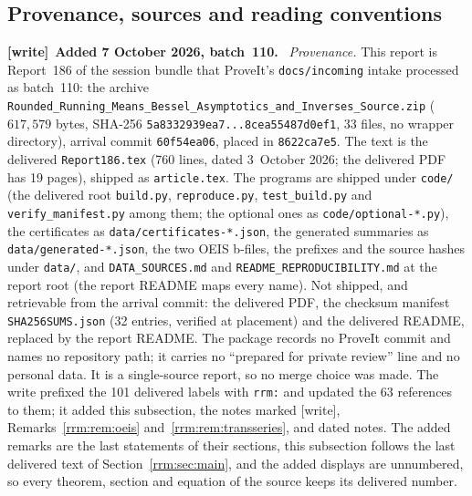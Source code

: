\documentclass[11pt]{article}
\theoremstyle{remark}\newtheorem{remark}[theorem]{Remark}
\newcommand{\file}[1]{\nolinkurl{#1}}
\newenvironment{writenote}[1][]{\par\smallskip\begingroup\small
 \noindent\textbf{[write]}\if\relax\detokenize{#1}\relax\else~\textbf{#1.}\fi\ }%
 {\par\endgroup\smallskip}
\begin{document}
\subsection{Provenance, sources and reading conventions}\label{rrm:sec:provenance}
\begin{writenote}[Added 7 October 2026, batch~110]
\emph{Provenance.} This report is Report~186 of the session bundle that
ProveIt's \file{docs/incoming} intake processed as batch~110: the archive
\file{Rounded_Running_Means_Bessel_Asymptotics_and_Inverses_Source.zip}
($617{,}579$ bytes, SHA-256 \file{5a8332939ea7...8cea55487d0ef1},
33 files, no wrapper directory), arrival commit \file{60f54ea06}, placed in
\file{8622ca7e5}. The text is the delivered \file{Report186.tex} (760 lines,
dated 3~October 2026; the delivered PDF has 19 pages), shipped as
\file{article.tex}. The programs are shipped under \file{code/} (the
delivered root \file{build.py}, \file{reproduce.py}, \file{test_build.py}
and \file{verify_manifest.py} among them; the optional ones as
\file{code/optional-*.py}), the certificates as
\file{data/certificates-*.json}, the generated summaries as
\file{data/generated-*.json}, the two OEIS b-files, the prefixes and the
source hashes under \file{data/}, and \file{DATA_SOURCES.md} and
\file{README_REPRODUCIBILITY.md} at the report root (the report README maps
every name). Not shipped, and retrievable from the arrival commit: the
delivered PDF, the checksum manifest \file{SHA256SUMS.json} (32 entries,
verified at placement) and the delivered README, replaced by the report
README. The package records no ProveIt commit and names no repository path;
it carries no ``prepared for private review'' line and no personal data. It
is a single-source report, so no merge choice was made. The write prefixed
the 101 delivered labels with \file{rrm:} and updated the 63 references to
them; it added this subsection, the notes marked [write],
Remarks~\ref{rrm:rem:oeis} and~\ref{rrm:rem:transseries}, and dated notes.
The added remarks are the last statements of their sections, this
subsection follows the last delivered text of Section~\ref{rrm:sec:main},
and the added displays are unnumbered, so every theorem, section and
equation of the source keeps its delivered number.


\end{writenote}
\end{document}
